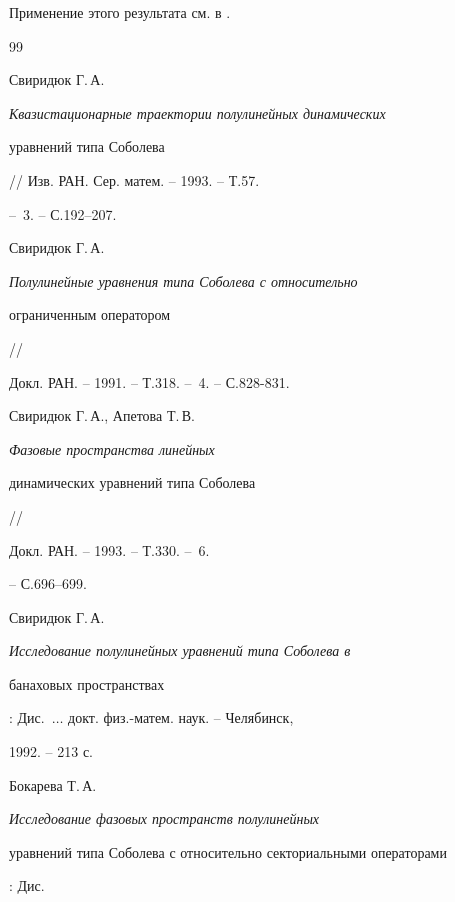  




\begin{notes} Применение этого результата см. в \cite{S8}. 


\end{notes} 


 


\begin{thebibliography}{99} 


 




Свиридюк Г.\,А. {\em Квазистационарные траектории полулинейных динамических 


уравнений типа Соболева} // Изв. РАН. Сер. матем. -- 1993. -- Т.57. 


-- \No\,3. -- С.192--207. 


 




Свиридюк Г.\,А. {\em Полулинейные уравнения типа Соболева с относительно 


ограниченным оператором} //


Докл. РАН. -- 1991. -- Т.318. -- \No\,4. -- С.828-831. 


 




Свиридюк Г.\,А., Апетова Т.\,В. {\em Фазовые пространства линейных 


динамических уравнений типа Соболева} //


Докл. РАН. -- 1993. -- Т.330. -- \No\,6. 


-- С.696--699. 


 




Свиридюк Г.\,А. {\em Исследование полулинейных уравнений типа Соболева в 


банаховых пространствах}: Дис.~$\dots$ докт. физ.-матем. наук. -- Челябинск, 


1992. -- 213 с. 


 




Бокарева Т.\,А. {\em Исследование фазовых пространств полулинейных 


уравнений типа Соболева с относительно секториальными операторами}: Дис.~



\end{thebibliography}
